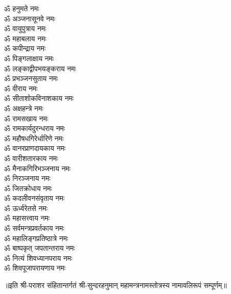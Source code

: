 \begin{multicols}{2}
\begin{flushleft}
ॐ हनुमते नमः\\
ॐ अञ्जनासूनवे नमः\\
ॐ वायुपुत्राय नमः\\
ॐ महाबलाय नमः\\
ॐ कपीन्द्राय नमः\\
ॐ पिङ्गलाक्षाय नमः\\
ॐ लङ्काद्वीपभयङ्कराय नमः\\
ॐ प्रभञ्जनसुताय नमः\\
ॐ वीराय नमः\\
ॐ सीताशोकविनाशकाय नमः\hfill{}\\
ॐ अक्षहन्त्रे नमः\\
ॐ रामसखाय नमः\\
ॐ रामकार्यदुरन्धराय नमः\\
ॐ महौषधगिरेर्धारिणे नमः\\
ॐ वानरप्राणदायकाय नमः\\
ॐ वारीशतारकाय नमः\\
ॐ मैनाकगिरिभञ्जनाय नमः\\
ॐ निरञ्जनाय नमः\\
ॐ जितक्रोधाय नमः\\
ॐ कदलीवनसंवृताय नमः\hfill{}\\
ॐ ऊर्ध्वरेतसे नमः\\
ॐ महासत्त्वाय नमः\\
ॐ सर्वमन्त्रप्रवर्तकाय नमः\\
ॐ महालिङ्गप्रतिष्ठात्रे नमः\\
ॐ बाष्पकृत् जपतान्तराय नमः\\
ॐ नित्यं शिवध्यानपराय नमः\\
ॐ शिवपूजापरायणाय नमः\hfill{}\\
\end{flushleft}
\end{multicols}
\centerline{॥इति श्री-पराशर संहितान्तर्गतं श्री-सुन्दरहनुमान् महामन्त्रनामस्तोत्रस्य नामावलिरूपं सम्पूर्णम्॥}
